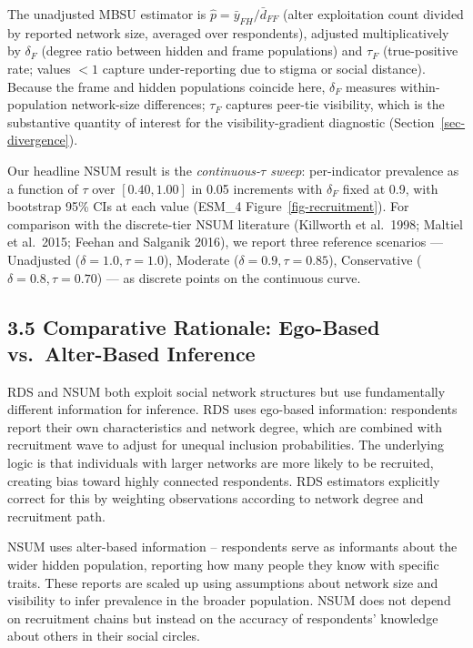 \documentclass[
  12pt,
  letterpaper,
  DIV=11,
  numbers=noendperiod]{scrartcl}
\begin{document}
The unadjusted MBSU estimator is
\(\hat{p} = \bar{y}_{FH} / \bar{d}_{FF}\) (alter exploitation count
divided by reported network size, averaged over respondents), adjusted
multiplicatively by \(\delta_F\) (degree ratio between hidden and frame
populations) and \(\tau_F\) (true-positive rate; values \(< 1\) capture
under-reporting due to stigma or social distance). Because the frame and
hidden populations coincide here, \(\delta_F\) measures
within-population network-size differences; \(\tau_F\) captures peer-tie
visibility, which is the substantive quantity of interest for the
visibility-gradient diagnostic (Section~\ref{sec-divergence}).

Our headline NSUM result is the \emph{continuous-\(\tau\) sweep}:
per-indicator prevalence as a function of \(\tau\) over \([0.40, 1.00]\)
in 0.05 increments with \(\delta_F\) fixed at 0.9, with bootstrap 95\%
CIs at each value (ESM\_4 Figure~\ref{fig-recruitment}). For comparison
with the discrete-tier NSUM literature (Killworth et al.~1998; Maltiel
et al.~2015; Feehan and Salganik 2016), we report three reference
scenarios --- Unadjusted (\(\delta = 1.0, \tau = 1.0\)), Moderate
(\(\delta = 0.9, \tau = 0.85\)), Conservative
(\(\delta = 0.8, \tau = 0.70\)) --- as discrete points on the continuous
curve.

\subsection{3.5 Comparative Rationale: Ego-Based vs.~Alter-Based
Inference}\label{sec-comparative-rationale}

RDS and NSUM both exploit social network structures but use
fundamentally different information for inference. RDS uses ego-based
information: respondents report their own characteristics and network
degree, which are combined with recruitment wave to adjust for unequal
inclusion probabilities. The underlying logic is that individuals with
larger networks are more likely to be recruited, creating bias toward
highly connected respondents. RDS estimators explicitly correct for this
by weighting observations according to network degree and recruitment
path.

NSUM uses alter-based information -- respondents serve as informants
about the wider hidden population, reporting how many people they know
with specific traits. These reports are scaled up using assumptions
about network size and visibility to infer prevalence in the broader
population. NSUM does not depend on recruitment chains but instead on
the accuracy of respondents' knowledge about others in their social
circles.
\end{document}
